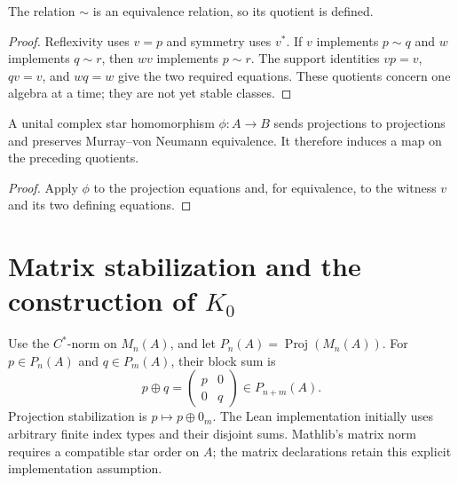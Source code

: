 \begin{proposition}\label{prop:projection-equivalence}
The relation $\sim$ is an equivalence relation, so its quotient is defined.
\end{proposition}
\begin{proof}
\leanok
Reflexivity uses $v=p$ and symmetry uses $v^*$. If $v$ implements $p\sim q$
and $w$ implements $q\sim r$, then $wv$ implements $p\sim r$.
The support identities $vp=v$, $qv=v$, and $wq=w$ give the two required equations.
These quotients concern one algebra at a time; they are not yet stable classes.
\end{proof}

\begin{proposition}\label{prop:projection-map}
A unital complex star homomorphism $\phi:A\to B$ sends projections to
projections and preserves Murray--von Neumann equivalence. It therefore
induces a map on the preceding quotients.
\end{proposition}
\begin{proof}
\leanok
Apply $\phi$ to the projection equations and, for equivalence, to the
witness $v$ and its two defining equations.
\end{proof}

\section{Matrix stabilization and the construction of $K_0$}

\begin{definition}\label{def:cstar-matrix-projection}
\leanok
Use the $C^*$-norm on $M_n(A)$, and let $P_n(A)=\operatorname{Proj}(M_n(A))$.
For $p\in P_n(A)$ and $q\in P_m(A)$, their block sum is
\[
 p\oplus q=\begin{pmatrix}p&0\\0&q\end{pmatrix}\in P_{n+m}(A).
\]
Projection stabilization is $p\mapsto p\oplus 0_m$.
The Lean implementation initially uses arbitrary finite index types and their
disjoint sums. Mathlib's matrix norm requires a compatible star order on $A$;
the matrix declarations retain this explicit implementation assumption.
\end{definition}


